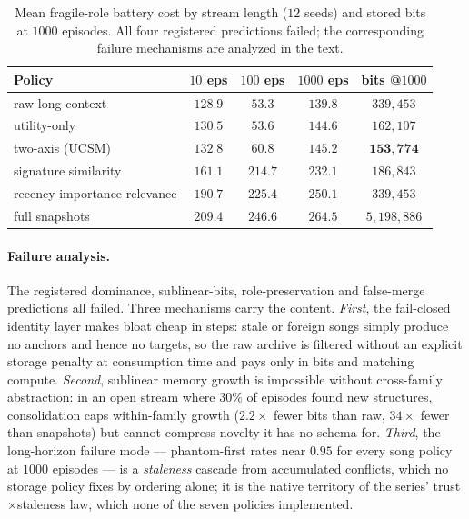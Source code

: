 \documentclass{article}
\begin{document}
\begin{table}[h]
\centering
\caption{Mean fragile-role battery cost by stream length ($12$ seeds)
and stored bits at $1000$ episodes. All four registered predictions
failed; the corresponding failure mechanisms are analyzed in the text.}
\label{p5:tab:u7}
\small
\begin{tabular}{lcccc}
\toprule
Policy & $10$ eps & $100$ eps & $1000$ eps & bits @$1000$ \\
\midrule
raw long context & $128.9$ & $\mathbf{53.3}$ & $\mathbf{139.8}$ & $339{,}453$ \\
utility-only & $130.5$ & $53.6$ & $144.6$ & $162{,}107$ \\
two-axis (UCSM) & $132.8$ & $60.8$ & $145.2$ & $\mathbf{153{,}774}$ \\
signature similarity & $161.1$ & $214.7$ & $232.1$ & $186{,}843$ \\
recency-importance-relevance & $190.7$ & $225.4$ & $250.1$ & $339{,}453$ \\
full snapshots & $209.4$ & $246.6$ & $264.5$ & $5{,}198{,}886$ \\
\bottomrule
\end{tabular}
\end{table}

\paragraph{Failure analysis.} The registered dominance,
sublinear-bits, role-preservation and false-merge predictions all
failed. Three mechanisms carry the content. \emph{First}, the
fail-closed identity layer makes bloat cheap in steps: stale or
foreign songs simply produce no anchors and hence no targets, so the
raw archive is filtered without an explicit storage penalty at consumption time and pays only in
bits and matching compute. \emph{Second}, sublinear memory growth is
impossible without cross-family abstraction: in an open stream where
$30\%$ of episodes found new structures, consolidation caps
within-family growth ($2.2\times$ fewer bits than raw, $34\times$
fewer than snapshots) but cannot compress novelty it has no schema
for. \emph{Third}, the long-horizon failure mode --- phantom-first
rates near $0.95$ for every song policy at $1000$ episodes --- is a
\emph{staleness} cascade from accumulated conflicts, which no storage
policy fixes by ordering alone; it is the native territory of the
series' trust$\times$staleness law, which none of the seven policies
implemented.
\end{document}

